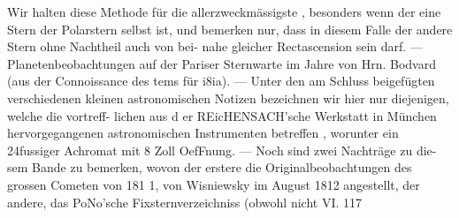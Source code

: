 \documentclass[12pt,a4paper]{article}
\begin{document}
Wir halten diese Methode für die allerzweckmässigste , besonders wenn der eine Stern der Polarstern\newline
selbst ist, und bemerken nur, dass in diesem Falle der andere Stern ohne Nachtheil auch von bei-\newline
nahe gleicher Rectascension sein darf. --- Planetenbeobachtungen auf der Pariser Sternwarte im Jahre von Hrn. Bodvard (aus der Connoissance des tems für i8ia). --- Unter den am Schluss beigefügten\newline
verschiedenen kleinen astronomischen Notizen bezeichnen wir hier nur diejenigen, welche die vortreff-\newline
lichen aus d er REicHENSACH'sche Werkstatt in München hervorgegangenen astronomischen Instrumenten\newline
betreffen , worunter ein 24fussiger Achromat mit 8 Zoll OefFnung. --- Noch sind zwei Nachträge zu die-\newline
sem Bande zu bemerken, wovon der erstere die Originalbeobachtungen des grossen Cometen von 181 1,\newline
von Wisniewsky im August 1812 angestellt, der andere, das PoNo'sche Fixsternverzeichniss (obwohl nicht\newline
VI. 117\newline
\end{document}

